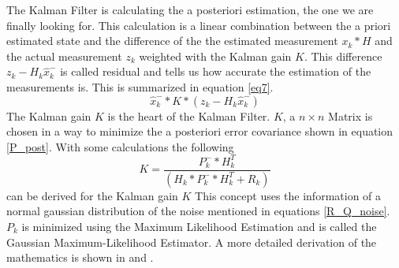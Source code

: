 The Kalman Filter is calculating the a posteriori estimation, the one we are finally looking for. This calculation is a linear combination between the a priori estimated state and the difference of the the estimated measurement $x_k*H$ and the actual measurement $z_k$ weighted with the Kalman gain $K$. This difference $z_k-H_k\hat{x}^{-}_k$ is  called residual and tells us how accurate the estimation of the measurements is. This is summarized in equation \ref{eq7}.
\begin{equation}
\hat{x}_k^{-}*K*(z_k-H_k\hat{x}^{-}_k)\label{eq7}
\end{equation}
The Kalman gain $K$ is the heart of the Kalman Filter. $K$, a $n\times n$ Matrix is chosen in a way to minimize the a posteriori error covariance shown in equation \ref{P_post}. With some calculations the following 
\begin{equation}
K=\frac{P^{-}_k*H^{T}_k}{(H_k*P^{-}_k*H^{T}_k+R_k)}
\end{equation}
can be derived for the Kalman gain $K$ \cite{welch1997} 
This concept uses the information of a normal gaussian distribution of the noise mentioned in equations \ref{R_Q_noise}. $P_k$ is minimized using the Maximum Likelihood Estimation and is called the  Gaussian Maximum-Likelihood Estimator. A more detailed derivation of the mathematics is shown in \cite{maybeck1979} and \cite{andrews2007}.


